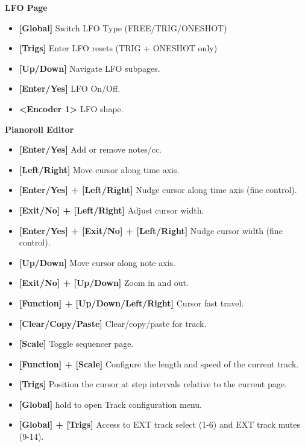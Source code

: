 \textbf{LFO Page} 
\begin{itemize}
     \item \textbf{[Global]} Switch LFO Type (FREE/TRIG/ONESHOT)
     \item \textbf{[Trigs] }Enter LFO resets (TRIG + ONESHOT only)
     \item \textbf{[Up/Down]} Navigate LFO subpages.
     \item \textbf{[Enter/Yes]} LFO On/Off.
     \item \textbf{<Encoder 1>} LFO shape.

     \end{itemize}
\textbf{Pianoroll Editor}
\begin{itemize}
     \item \textbf{[Enter/Yes]} Add or remove notes/cc.
     \item \textbf{[Left/Right]} Move cursor along time axis.
     \item \textbf{[Enter/Yes] + [Left/Right]} Nudge cursor along time axis (fine control).
     \item \textbf{[Exit/No] + [Left/Right]} Adjust cursor width.
     \item \textbf{[Enter/Yes] + [Exit/No] + [Left/Right]} Nudge cursor width (fine control).
     \item \textbf{[Up/Down]} Move cursor along note axis.
     \item \textbf{[Exit/No] + [Up/Down]} Zoom in and out.
     \item \textbf{[Function] + [Up/Down/Left/Right]} Cursor fast travel.
     \item \textbf{[Clear/Copy/Paste]} Clear/copy/paste for track.
     \item \textbf{[Scale]} Toggle sequencer page.
     \item \textbf{[Function] + [Scale]} Configure the length and speed of the current track.
     \item \textbf{[Trigs]} Position the cursor at step intervals relative to the current page.
\item \textbf{[Global]} hold to open Track configuration menu.
\item \textbf{[Global] + [Trigs]} Access to EXT track select (1-6) and EXT track mutes (9-14).
\end{itemize}

